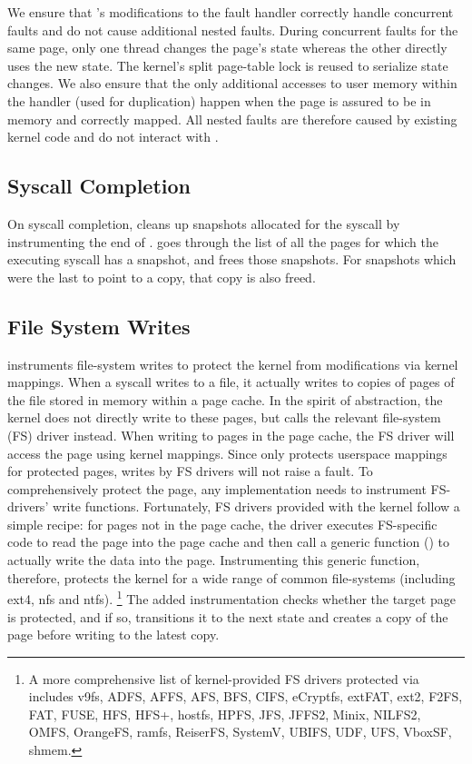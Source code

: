 \documentclass[letterpaper,twocolumn,10pt]{article}
\begin{document}
We ensure that \tiktok's modifications to the fault handler 
correctly handle concurrent faults and do not cause additional 
nested faults. 
During concurrent faults for the same page, only one thread 
changes the page's state whereas the other directly uses the new 
state.
The kernel's split page-table lock is reused to serialize state 
changes. 
We also ensure that the only additional accesses to user memory 
within the handler (used for duplication) happen when the page 
is assured to be in memory and correctly mapped.
All nested faults are therefore caused by existing kernel code
and do not interact with \tiktok.

\subsection{Syscall Completion}

On syscall completion, \tiktok cleans up snapshots allocated for 
the syscall by instrumenting the end of .
\tiktok goes through the list of all the pages for which the 
executing syscall has a snapshot, and frees those snapshots.
For snapshots which were the last to point to a copy, that 
copy is also freed.


\subsection{File System Writes}

\tiktok instruments file-system writes to protect the kernel
from modifications via kernel mappings.
When a  syscall writes to a file, it actually
writes to copies of pages of the file stored in memory within 
a page cache.
In the spirit of abstraction, the kernel does not directly write to 
these pages, but calls the relevant file-system (FS) driver instead.
When writing to pages in the page cache, the FS driver will access the 
page using kernel mappings.
Since \tiktok only protects userspace mappings for protected pages, 
writes by FS drivers will not raise a fault.
To comprehensively protect the page, any implementation needs to 
instrument FS-drivers' write functions.
Fortunately, FS drivers provided with the kernel follow a simple 
recipe: for pages not in the page cache, the driver executes 
FS-specific code to read the page into the page cache and then 
call a generic function () to actually 
write the data into the page.
Instrumenting this generic function, therefore, protects the kernel
for a wide range of common file-systems (including ext4, nfs and 
ntfs). \footnote{A more comprehensive list of kernel-provided FS drivers 
protected via  includes v9fs, ADFS, AFFS, 
AFS, BFS, CIFS, eCryptfs, extFAT, ext2, F2FS,  FAT, FUSE, HFS, HFS+, 
hostfs, HPFS, JFS, JFFS2, Minix, NILFS2, OMFS, OrangeFS, ramfs, ReiserFS,
SystemV, UBIFS, UDF, UFS, VboxSF, shmem.}
The added instrumentation checks whether the target page is 
protected, and if so, transitions it to the next state and 
creates a copy of the page before writing to the latest copy.
\end{document}

